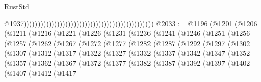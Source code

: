 \begin{lexlean}{RustStd}
\begin{coremodule}
{\begin{coremodule}
{{{{{{{{{{{{                                                                                                  @1937)))))))))))))))))))))))))))))))))))))))))))))))
@2033 := @1196
    (@1201
      (@1206
        (@1211
          (@1216
            (@1221
              (@1226
                (@1231
                  (@1236
                    (@1241
                      (@1246
                        (@1251
                          (@1256
                            (@1257
                              (@1262
                                (@1267
                                  (@1272
                                    (@1277
                                      (@1282
                                        (@1287
                                          (@1292
                                            (@1297
                                              (@1302
                                                (@1307
                                                  (@1312
                                                    (@1317
                                                      (@1322
                                                        (@1327
                                                          (@1332
                                                            (@1337
                                                              (@1342
                                                                (@1347
                                                                  (@1352
                                                                    (@1357
                                                                      (@1362
                                                                        (@1367
                                                                          (@1372
                                                                            (@1377
                                                                              (@1382
                                                                                (@1387
                                                                                  (@1392
                                                                                    (@1397
                                                                                      (@1402
                                                                                        (@1407
                                                                                          (@1412
                                                                                            (@1417
}}}}}}}}}}}}
\end{coremodule}}
\end{coremodule}
\end{lexlean}
